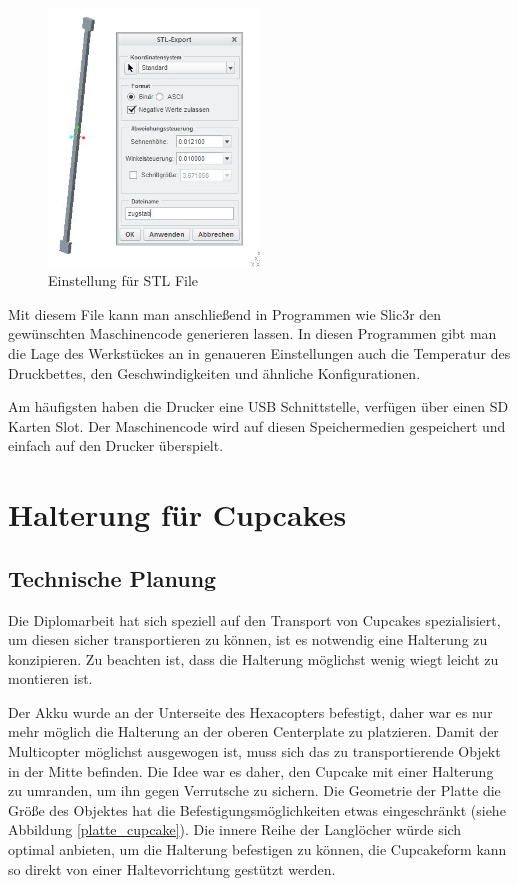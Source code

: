 			\begin{figure}[tbh]
			\begin{centering}
			\includegraphics[width = 0.5\textwidth]{Bilder/stl_file_optionen}
			\par\end{centering}
	 		\caption{Einstellung für STL File}
			\label{stl_file_optionen}
			\end{figure}

		Mit diesem File kann man anschließend in Programmen wie Slic3r den gewünschten Maschinencode generieren lassen.
		In diesen Programmen gibt man die Lage des Werkstückes an \bzw in genaueren Einstellungen auch die Temperatur des Druckbettes, den Geschwindigkeiten und ähnliche Konfigurationen.

		Am häufigsten haben die Drucker eine USB Schnittstelle, \bzw verfügen über einen SD Karten Slot.
		Der Maschinencode wird auf diesen Speichermedien gespeichert und einfach auf den Drucker überspielt.


\section{Halterung für Cupcakes}

		\subsection{Technische Planung}

		Die Diplomarbeit hat sich speziell auf den Transport von Cupcakes spezialisiert, um diesen sicher transportieren zu können, ist es notwendig eine Halterung zu konzipieren.
		Zu beachten ist, dass die Halterung möglichst wenig wiegt \bzw leicht zu montieren ist.

		Der Akku wurde an der Unterseite des Hexacopters befestigt, daher war es nur mehr möglich die Halterung an der oberen Centerplate zu platzieren.
		Damit der Multicopter möglichst ausgewogen ist, muss sich das zu transportierende Objekt in der Mitte befinden.
		Die Idee war es daher, den Cupcake mit einer Halterung zu umranden, um ihn gegen Verrutsche zu sichern. Die Geometrie der Platte \bzw die Größe des Objektes hat die Befestigungsmöglichkeiten etwas eingeschränkt (siehe Abbildung \ref{platte_cupcake}).
		Die innere Reihe der Langlöcher würde sich optimal anbieten, um die Halterung befestigen zu können, die Cupcakeform kann so direkt von einer Haltevorrichtung gestützt werden.


